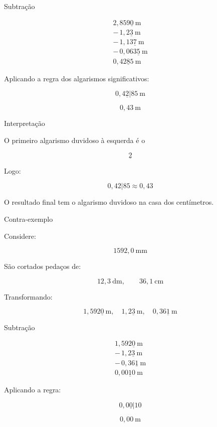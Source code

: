 \documentclass[aspectratio=169,10pt]{beamer}
\begin{document}

\begin{frame}{Subtração}

\[
\begin{array}{r}
2,859\underline{0}\ \text{m} \\
-\,1,2\underline{3}\ \text{m} \\
-\,1,13\underline{7}\ \text{m} \\
-\,0,063\underline{5}\ \text{m} \\
\hline
0,4\underline{285}\ \text{m}
\end{array}
\]

Aplicando a regra dos algarismos significativos:

\[
0,4\underline{2}|85 \ \text{m}
\]

\[
0,43\ \text{m}
\]

\end{frame}


\begin{frame}{Interpretação}

O primeiro algarismo duvidoso à esquerda é o

\[
\underline{2}
\]

Logo:

\[
0,42|85 \approx 0,43
\]

O resultado final tem o algarismo duvidoso na casa dos centímetros.

\end{frame}


\begin{frame}{Contra-exemplo}

Considere:

\[
1592,0\ \text{mm}
\]

São cortados pedaços de:

\[
12,3\ \text{dm},\qquad
36,1\ \text{cm}
\]

Transformando:

\[
1,592\underline{0}\ \text{m},\quad
1,2\underline{3}\ \text{m},\quad
0,36\underline{1}\ \text{m}
\]

\end{frame}


\begin{frame}{Subtração}

\[
\begin{array}{r}
1,592\underline{0}\ \text{m} \\
-\,1,2\underline{3}\ \text{m} \\
-\,0,36\underline{1}\ \text{m} \\
\hline
0,0\underline{010}\ \text{m}
\end{array}
\]

Aplicando a regra:

\[
0,0\underline{0}|10
\]

\[
0,00\ \text{m}
\]

\end{frame}
\end{document}

